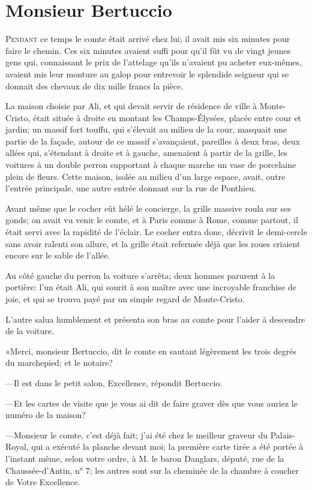 \chapter{Monsieur Bertuccio}

\lettrine{P}{endant} ce temps le comte était arrivé chez lui; il avait mis six minutes pour faire le chemin. Ces six minutes avaient suffi pour qu'il fût vu de vingt jeunes gens qui, connaissant le prix de l'attelage qu'ils n'avaient pu acheter eux-mêmes, avaient mis leur monture au galop pour entrevoir le splendide seigneur qui se donnait des chevaux de dix mille francs la pièce. 

La maison choisie par Ali, et qui devait servir de résidence de ville à Monte-Cristo, était située à droite en montant les Champs-Élysées, placée entre cour et jardin; un massif fort touffu, qui s'élevait au milieu de la cour, masquait une partie de la façade, autour de ce massif s'avançaient, pareilles à deux bras, deux allées qui, s'étendant à droite et à gauche, amenaient à partir de la grille, les voitures à un double perron supportant à chaque marche un vase de porcelaine plein de fleurs. Cette maison, isolée au milieu d'un large espace, avait, outre l'entrée principale, une autre entrée donnant sur la rue de Ponthieu. 

Avant même que le cocher eût hélé le concierge, la grille massive roula sur ses gonds; on avait vu venir le comte, et à Paris comme à Rome, comme partout, il était servi avec la rapidité de l'éclair. Le cocher entra donc, décrivit le demi-cercle sans avoir ralenti son allure, et la grille était refermée déjà que les roues criaient encore sur le sable de l'allée. 

Au côté gauche du perron la voiture s'arrêta; deux hommes parurent à la portière: l'un était Ali, qui sourit à son maître avec une incroyable franchise de joie, et qui se trouva payé par un simple regard de Monte-Cristo. 

L'autre salua humblement et présenta son bras au comte pour l'aider à descendre de la voiture. 

«Merci, monsieur Bertuccio, dit le comte en sautant légèrement les trois degrés du marchepied; et le notaire? 

—Il est dans le petit salon, Excellence, répondit Bertuccio. 

—Et les cartes de visite que je vous ai dit de faire graver dès que vous auriez le numéro de la maison?  

—Monsieur le comte, c'est déjà fait; j'ai été chez le meilleur graveur du Palais-Royal, qui a exécuté la planche devant moi; la première carte tirée a été portée à l'instant même, selon votre ordre, à M. le baron Danglars, député, rue de la Chaussée-d'Antin, n° 7; les autres sont sur la cheminée de la chambre à coucher de Votre Excellence. 

